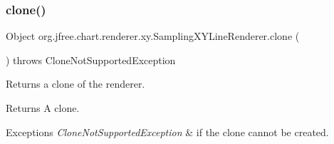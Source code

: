 \subsubsection{\texorpdfstring{clone()}{clone()}}
{\footnotesize\ttfamily Object org.\+jfree.\+chart.\+renderer.\+xy.\+Sampling\+X\+Y\+Line\+Renderer.\+clone (\begin{DoxyParamCaption}{ }\end{DoxyParamCaption}) throws Clone\+Not\+Supported\+Exception}

Returns a clone of the renderer.

\begin{DoxyReturn}{Returns}
A clone.
\end{DoxyReturn}

\begin{DoxyExceptions}{Exceptions}
{\em Clone\+Not\+Supported\+Exception} & if the clone cannot be created. \\
\hline
\end{DoxyExceptions}
\mbox{\label{classorg_1_1jfree_1_1chart_1_1renderer_1_1xy_1_1_sampling_x_y_line_renderer_ac3d7b9a5e589a98508f2907005524f5b}} 

